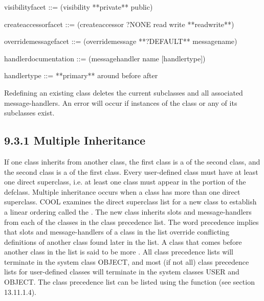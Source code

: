 \documentclass[letterpaper,10pt,english]{sphinxmanual}
\begin{document}
\begin{sphinxVerbatim}[commandchars=\\\{\}]
\PYGZlt{}visibility\PYGZhy{}facet\PYGZgt{} ::= (visibility **private** \textbar{} public)

\PYGZlt{}create\PYGZhy{}accessor\PYGZhy{}facet\PYGZgt{} ::= (create\PYGZhy{}accessor ?NONE \textbar{} read \textbar{} write \textbar{}
                             **read\PYGZhy{}write**)

\PYGZlt{}override\PYGZhy{}message\PYGZhy{}facet\PYGZgt{} ::= (override\PYGZhy{}message **?DEFAULT** \textbar{} \PYGZlt{}message\PYGZhy{}name\PYGZgt{})

\PYGZlt{}handler\PYGZhy{}documentation\PYGZgt{} ::= (message\PYGZhy{}handler \PYGZlt{}name\PYGZgt{} [\PYGZlt{}handler\PYGZhy{}type\PYGZgt{}])

\PYGZlt{}handler\PYGZhy{}type\PYGZgt{} ::= **primary** \textbar{} around \textbar{} before \textbar{} after
\end{sphinxVerbatim}

Redefining an existing class deletes the current subclasses and all
associated message-handlers. An error will occur if instances of the
class or any of its subclasses exist.


\subsection{9.3.1 Multiple Inheritance}
\label{\detokenize{cool:multiple-inheritance}}
If one class inherits from another class, the first class is a
 of the second class, and the second class is a
 of the first class. Every user-defined class must have at
least one direct superclass, i.e. at least one class must appear in the
 portion of the defclass. Multiple inheritance occurs when a class
has more than one direct superclass. COOL examines the direct superclass
list for a new class to establish a linear ordering called the . The new class inherits slots and message-handlers
from each of the classes in the class precedence list. The word
precedence implies that slots and message-handlers of a class in the
list override conflicting definitions of another class found later in
the list. A class that comes before another class in the list is said to
be more . All class precedence lists will terminate in the
system class OBJECT, and most (if not all) class precedence lists for
user-defined classes will terminate in the system classes USER and
OBJECT. The class precedence list can be listed using the
 function (see section 13.11.1.4).
\end{document}
